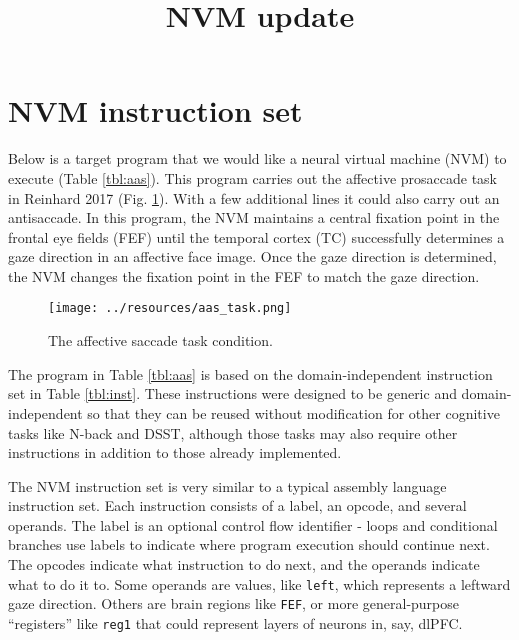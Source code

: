 \documentclass[pdftex,12pt,letterpaper]{article}
\begin{document}
\title{NVM update}
\date{}
\maketitle

\section{NVM instruction set}

Below is a target program that we would like a neural virtual machine (NVM) to execute (Table \ref{tbl:aas}).  This program carries out the affective prosaccade task in Reinhard 2017 (Fig. \ref{fig:aas_task}).  With a few additional lines it could also carry out an antisaccade.  In this program, the NVM maintains a central fixation point in the frontal eye fields (FEF) until the temporal cortex (TC) successfully determines a gaze direction in an affective face image.  Once the gaze direction is determined, the NVM changes the fixation point in the FEF to match the gaze direction.

\begin{figure}[H]
\centering
\texttt{[image: ../resources/aas\_task.png]}
\caption{The affective saccade task condition.}
\label{fig:aas_task}
\end{figure}

The program in Table \ref{tbl:aas} is based on the domain-independent instruction set in Table \ref{tbl:inst}.  These instructions were designed to be generic and domain-independent so that they can be reused without modification for other cognitive tasks like N-back and DSST, although those tasks may also require other instructions in addition to those already implemented.

The NVM instruction set is very similar to a typical assembly language instruction set.  Each instruction consists of a label, an opcode, and several operands.  The label is an optional control flow identifier - loops and conditional branches use labels to indicate where program execution should continue next.  The opcodes indicate what instruction to do next, and the operands indicate what to do it to.  Some operands are values, like \texttt{left}, which represents a leftward gaze direction.  Others are brain regions like \texttt{FEF}, or more general-purpose ``registers'' like \texttt{reg1} that could represent layers of neurons in, say, dlPFC.
\end{document}
